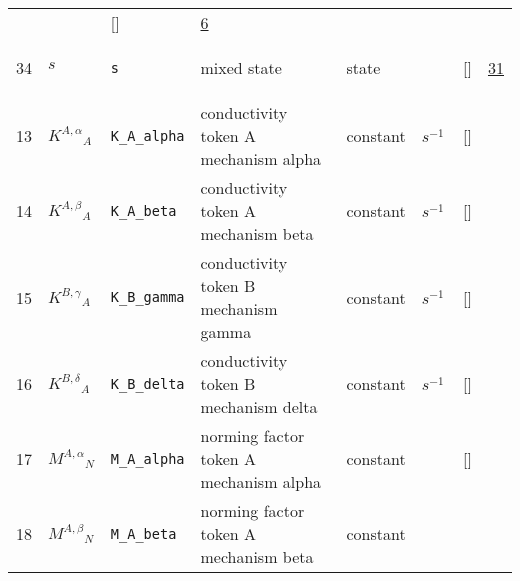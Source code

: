 \begin{longtable}{|p{1cm}|p{3cm}|p{3cm}|p{7cm}|p{3.0cm}|p{3cm}|p{2cm}|p{1cm}|}
             & $  $
             & []
             & \hyperlink{"e:6"}{ 6 }
                 \\
    34
             & \hypertarget{"v:34"}{ $ {s}{_{}} $}
             & \verb|s|
             & mixed state
             & \begin{lay}state \end{lay}
             & $  $
             & []
             & \hyperlink{"e:31"}{ 31 }
                 \\
    13
             & \hypertarget{"v:13"}{ $ {{K^{A,\alpha}}}{_{A}} $}
             & \verb|K_A_alpha|
             & conductivity token A mechanism alpha 
             & \begin{lay}constant \end{lay}
             & $ s^{-1} \, $
             & []
             & \\
    14
             & \hypertarget{"v:14"}{ $ {{K^{A,\beta}}}{_{A}} $}
             & \verb|K_A_beta|
             & conductivity token A mechanism beta
             & \begin{lay}constant \end{lay}
             & $ s^{-1} \, $
             & []
             & \\
    15
             & \hypertarget{"v:15"}{ $ {{K^{B,\gamma}}}{_{A}} $}
             & \verb|K_B_gamma|
             & conductivity token B mechanism gamma
             & \begin{lay}constant \end{lay}
             & $ s^{-1} \, $
             & []
             & \\
    16
             & \hypertarget{"v:16"}{ $ {{K^{B,\delta}}}{_{A}} $}
             & \verb|K_B_delta|
             & conductivity token B mechanism delta
             & \begin{lay}constant \end{lay}
             & $ s^{-1} \, $
             & []
             & \\
    17
             & \hypertarget{"v:17"}{ $ {{M^{A,\alpha}}}{_{N}} $}
             & \verb|M_A_alpha|
             & norming factor token A mechanism alpha
             & \begin{lay}constant \end{lay}
             & $  $
             & []
             & \\
    18
             & \hypertarget{"v:18"}{ $ {{M^{A,\beta}}}{_{N}} $}
             & \verb|M_A_beta|
             & norming factor token A mechanism beta
             & \begin{lay}constant \end{lay}

\end{longtable}
